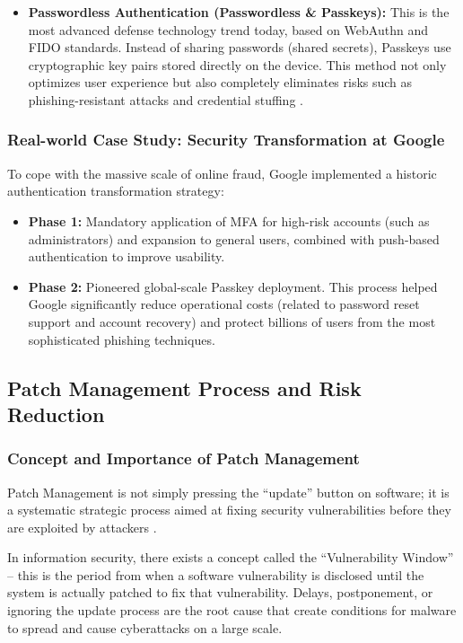 \begin{itemize}
    \item \textbf{Passwordless Authentication (Passwordless \& Passkeys):} This is the most advanced defense technology trend today, based on WebAuthn and FIDO standards. Instead of sharing passwords (shared secrets), Passkeys use cryptographic key pairs stored directly on the device. This method not only optimizes user experience but also completely eliminates risks such as phishing-resistant attacks and credential stuffing \cite{ref4}.
\end{itemize}

\subsubsection{Real-world Case Study: Security Transformation at Google}

To cope with the massive scale of online fraud, Google implemented a historic authentication transformation strategy:

\begin{itemize}
    \item \textbf{Phase 1:} Mandatory application of MFA for high-risk accounts (such as administrators) and expansion to general users, combined with push-based authentication to improve usability.
    
    \item \textbf{Phase 2:} Pioneered global-scale Passkey deployment. This process helped Google significantly reduce operational costs (related to password reset support and account recovery) and protect billions of users from the most sophisticated phishing techniques.
\end{itemize}

\subsection{Patch Management Process and Risk Reduction}

\subsubsection{Concept and Importance of Patch Management}

Patch Management is not simply pressing the ``update'' button on software; it is a systematic strategic process aimed at fixing security vulnerabilities before they are exploited by attackers \cite{kim2018fundamentals}.

In information security, there exists a concept called the ``Vulnerability Window'' – this is the period from when a software vulnerability is disclosed until the system is actually patched to fix that vulnerability. Delays, postponement, or ignoring the update process are the root cause that create conditions for malware to spread and cause cyberattacks on a large scale.

